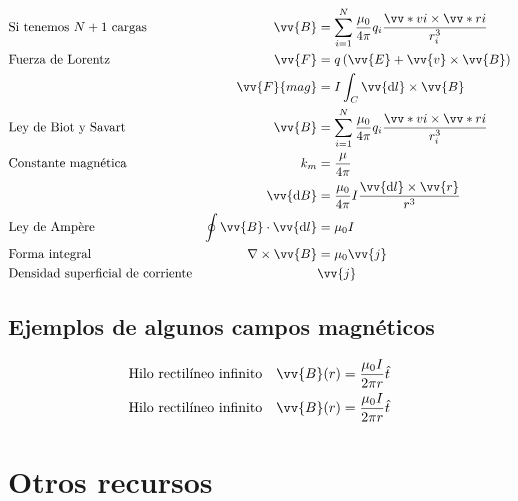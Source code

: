 \documentclass[a4paper, 8pt]{extarticle}
\renewcommand{\vec}[1]{\vv{{#1}}}
\renewcommand{\grad}{\nabla}
\begin{document}
\begin{multicols}{3}
  \begin{align*}
     & \text{Si tenemos }N+1 \text{ cargas}     & \vec{B}                        & = \sum_{i=1}^{N} \frac{\mu_0}{4\pi}q_i \frac{\vv*{v}{i}\times \vv*{r}{i}}{r_i^3}  \\
     & \text{Fuerza de Lorentz}                 & \vec{F}                        & = q \left( \vec{E} + \vec{v} \times \vec{B} \right)                               \\
     & \text{}                                  & \vv{F}{mag}                    & = I \int_{C} \vec{\dd l} \times \vec{B}                                           \\
     & \text{Ley de Biot y Savart}              & \vec{B}                        & = \sum_{i=1}^{N}\frac{\mu _0}{4\pi} q_i \frac{\vv*{v}{i}\times \vv*{r}{i}}{r_i^3} \\
     & \text{Constante magnética}               & k_m                            & = \frac{\mu}{4\pi}                                                                \\
     &                                          & \vec{\dd B}                    & = \frac{\mu_0}{4\pi} I \frac{\vec{\dd l}\times \vec{r}}{r^3}                      \\
     & \text{Ley de Ampère}                     & \oint \vec{B}\cdot \vec{\dd l} & = \mu_0 I                                                                         \\
     & \text{Forma integral}                    & \grad \times \vec{B}           & = \mu _0 \vec{j}                                                                  \\
     & \text{Densidad superficial de corriente} &                                & \vec{j}
  \end{align*}

  \subsection{Ejemplos de algunos campos magnéticos}
  \begin{align*}
     & \text{Hilo rectilíneo infinito} & \vec{B}(r) & = \frac{\mu_0I}{2\pi r}\hat{t} \\
     & \text{Hilo rectilíneo infinito} & \vec{B}(r) & = \frac{\mu_0I}{2\pi r}\hat{t} \\
  \end{align*}

  \section{Otros recursos}

\end{multicols}
\end{document}
